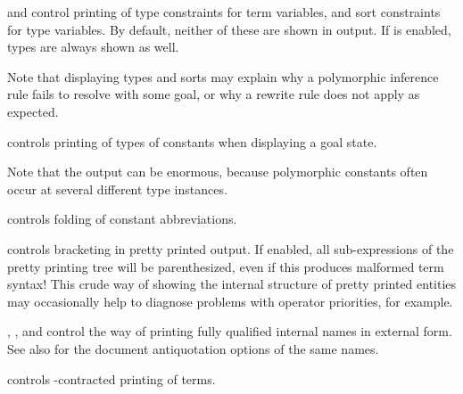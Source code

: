 \begin{isabellebody}
\begin{isamarkuptext}
\begin{description}
  \item \hyperlink{attribute.show-types}{\mbox{}} and \hyperlink{attribute.show-sorts}{\mbox{}} control
  printing of type constraints for term variables, and sort
  constraints for type variables.  By default, neither of these are
  shown in output.  If \hyperlink{attribute.show-sorts}{\mbox{}} is enabled, types are
  always shown as well.

  Note that displaying types and sorts may explain why a polymorphic
  inference rule fails to resolve with some goal, or why a rewrite
  rule does not apply as expected.

  \item \hyperlink{attribute.show-consts}{\mbox{}} controls printing of types of
  constants when displaying a goal state.

  Note that the output can be enormous, because polymorphic constants
  often occur at several different type instances.

  \item \hyperlink{attribute.show-abbrevs}{\mbox{}} controls folding of constant
  abbreviations.

  \item \hyperlink{attribute.show-brackets}{\mbox{}} controls bracketing in pretty
  printed output.  If enabled, all sub-expressions of the pretty
  printing tree will be parenthesized, even if this produces malformed
  term syntax!  This crude way of showing the internal structure of
  pretty printed entities may occasionally help to diagnose problems
  with operator priorities, for example.

  \item \hyperlink{attribute.long-names}{\mbox{}}, \hyperlink{attribute.short-names}{\mbox{}}, and
  \hyperlink{attribute.unique-names}{\mbox{}} control the way of printing fully
  qualified internal names in external form.  See also
   for the document antiquotation options of the
  same names.

  \item \hyperlink{attribute.eta-contract}{\mbox{}} controls -contracted
  printing of terms.


\end{description}
\end{isamarkuptext}
\end{isabellebody}
